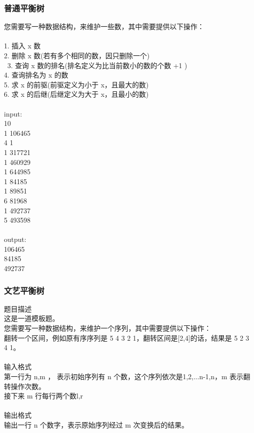 \subsubsection{普通平衡树}
您需要写一种数据结构，来维护一些数，其中需要提供以下操作：\\
\\
1. 插入 x 数\\
2. 删除 x 数(若有多个相同的数，因只删除一个)\\\
3. 查询 x 数的排名(排名定义为比当前数小的数的个数 +1 )\\
4. 查询排名为 x 的数\\
5. 求 x 的前驱(前驱定义为小于 x，且最大的数)\\
6. 求 x 的后继(后继定义为大于 x，且最小的数)\\
\\
input:\\
10\\
1 106465\\
4 1\\
1 317721\\
1 460929\\
1 644985\\
1 84185\\
1 89851\\
6 81968\\
1 492737\\
5 493598\\
\\
output:\\
106465\\
84185\\
492737\\

\subsubsection{文艺平衡树}
题目描述\\
这是一道模板题。\\
您需要写一种数据结构，来维护一个序列，其中需要提供以下操作：\\
翻转一个区间，例如原有序序列是 5 4 3 2 1，翻转区间是[2,4]的话，结果是 5 2 3 4 1。\\
\\
输入格式\\
第一行为 n,m ， 表示初始序列有 n 个数，这个序列依次是{1,2,...n-1,n}，m 表示翻转操作次数。\\
接下来 m 行每行两个数l,r\\
\\
输出格式\\
输出一行 n 个数字，表示原始序列经过 m 次变换后的结果。\\

